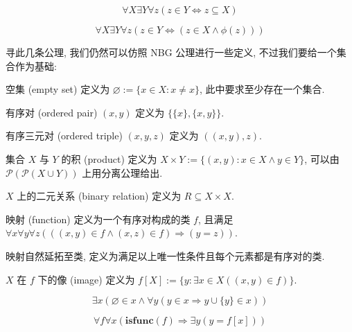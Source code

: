 \begin{axiom*}
    \label {axiom:ZF Axiom of Power Set}
    \[
        \forall X \exists Y \forall z (z \in Y \Leftrightarrow z \subseteq X)
    \]
\end{axiom*}

\begin{axiom*}
    \label {axiom:ZF Axiom Schema of Separations}
    \[
        \forall X \exists Y \forall z (z \in Y \Leftrightarrow (z \in X \land \phi (z)))
    \]
\end{axiom*}

寻此几条公理, 我们仍然可以仿照 NBG 公理进行一些定义, 不过我们要给一个集合作为基础:

\begin{definition}
    \label {definition:ZF empty set}
    空集 (empty set) 定义为 \(\varnothing := \{x \in X : x \neq x\}\), 此中要求至少存在一个集合.

    \label {definition:ZF ordered pair}
    有序对 (ordered pair) \((x,y)\) 定义为 \(\{\{x\},\{x,y\}\}\).

    \label {definition:ZF ordered triple}
    有序三元对 (ordered triple) \((x,y,z)\) 定义为 \(((x,y),z)\).

    \label {definition:ZF set product}
    集合 \(X\) 与 \(Y\) 的积 (product) 定义为 \(X \times Y := \{(x,y) : x \in X \land y \in Y\}\),
    可以由 \(\mathcal{P} (\mathcal{P} (X \cup Y))\) 上用分离公理给出.

    \label {definition:ZF binary relation}
    \(X\) 上的二元关系 (binary relation) 定义为 \(R \subseteq X \times X\).

    \label {definition:ZF function}
    映射 (function) 定义为一个有序对构成的类 \(f\), 且满足
    \(\forall x \forall y \forall z (((x,y) \in f \land (x,z) \in f) \Rightarrow (y = z))\).

    映射自然延拓至类, 定义为满足以上唯一性条件且每个元素都是有序对的类.

    \label {definition:ZF image}
    \(X\) 在 \(f\) 下的像 (image) 定义为 \(f[X] := \{y : \exists x \in X ((x,y) \in f)\}\).
\end{definition}

\begin{axiom*}
    \label {axiom:ZF Axiom of Infinity}
    \[
        \exists x (\varnothing \in x \land \forall y (y \in x \Rightarrow y \cup \{y\} \in x))
    \]
\end{axiom*}

\begin{axiom*}
    \label {axiom:ZF Axiom Schema of Replacement}
    \[
        \forall f \forall x (\mathbf{isfunc} (f) \Rightarrow \exists y (y = f[x]))
    \]
\end{axiom*}

